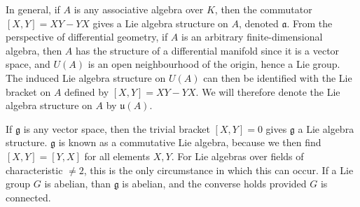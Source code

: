\begin{example}
    In general, if $A$ is any associative algebra over $K$, then the commutator $[X,Y] = XY - YX$ gives a Lie algebra structure on $A$, denoted $\mathfrak{a}$. From the perspective of differential geometry, if $A$ is an arbitrary finite-dimensional algebra, then $A$ has the structure of a differential manifold since it is a vector space, and $U(A)$ is an open neighbourhood of the origin, hence a Lie group. The induced Lie algebra structure on $U(A)$ can then be identified with the Lie bracket on $A$ defined by $[X,Y] = XY - YX$. We will therefore denote the Lie algebra structure on $A$ by $\mathfrak{u}(A)$.
\end{example}

\begin{example}
    If $\mathfrak{g}$ is any vector space, then the trivial bracket $[X,Y] = 0$ gives $\mathfrak{g}$ a Lie algebra structure. $\mathfrak{g}$ is known as a commutative Lie algebra, because we then find $[X,Y] = [Y,X]$ for all elements $X,Y$. For Lie algebras over fields of characteristic $\neq 2$, this is the only circumstance in which this can occur. If a Lie group $G$ is abelian, than $\mathfrak{g}$ is abelian, and the converse holds provided $G$ is connected.
\end{example}

